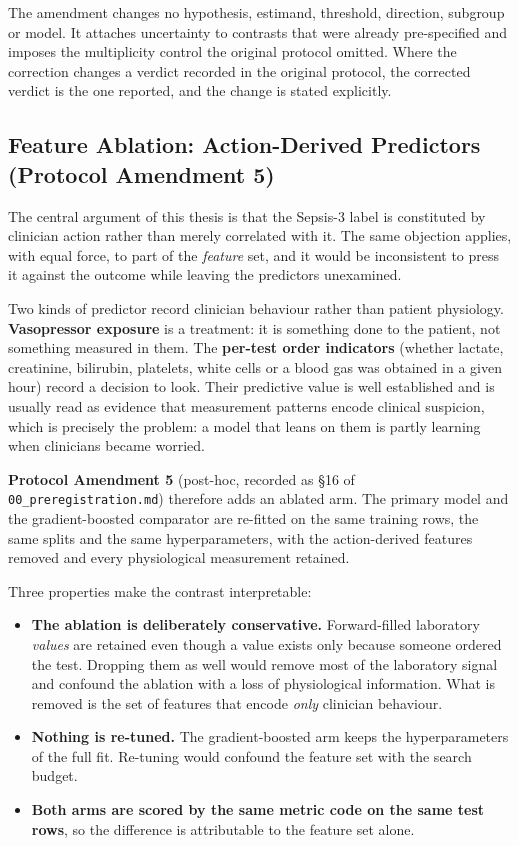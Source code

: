 The amendment changes no hypothesis, estimand, threshold, direction, subgroup
or model. It attaches uncertainty to contrasts that were already pre-specified
and imposes the multiplicity control the original protocol omitted. Where the
correction changes a verdict recorded in the original protocol, the corrected
verdict is the one reported, and the change is stated explicitly.

\subsection{Feature Ablation: Action-Derived Predictors (Protocol Amendment 5)}
\label{sec:ablation_method}

The central argument of this thesis is that the Sepsis-3 label is constituted
by clinician action rather than merely correlated with it. The same objection
applies, with equal force, to part of the \emph{feature} set, and it would be
inconsistent to press it against the outcome while leaving the predictors
unexamined.

Two kinds of predictor record clinician behaviour rather than patient
physiology. \textbf{Vasopressor exposure} is a treatment: it is something done
to the patient, not something measured in them. The \textbf{per-test order
indicators} (whether lactate, creatinine, bilirubin, platelets, white cells
or a blood gas was obtained in a given hour) record a decision to look. Their
predictive value is well established and is usually read as evidence that
measurement patterns encode clinical suspicion, which is precisely the problem:
a model that leans on them is partly learning when clinicians became worried.

\textbf{Protocol Amendment 5} (post-hoc, recorded as \S16 of
\texttt{00\_preregistration.md}) therefore adds an ablated arm. The primary
model and the gradient-boosted comparator are re-fitted on the same training
rows, the same splits and the same hyperparameters, with the
\pcAblNDropped{} action-derived features removed and every physiological
measurement retained.

Three properties make the contrast interpretable:

\begin{itemize}
    \item \textbf{The ablation is deliberately conservative.} Forward-filled
          laboratory \emph{values} are retained even though a value exists only
          because someone ordered the test. Dropping them as well would remove
          most of the laboratory signal and confound the ablation with a loss
          of physiological information. What is removed is the set of features
          that encode \emph{only} clinician behaviour.
    \item \textbf{Nothing is re-tuned.} The gradient-boosted arm keeps the
          hyperparameters of the full fit. Re-tuning would confound the feature
          set with the search budget.
    \item \textbf{Both arms are scored by the same metric code on the same test
          rows}, so the difference is attributable to the feature set alone.
\end{itemize}

